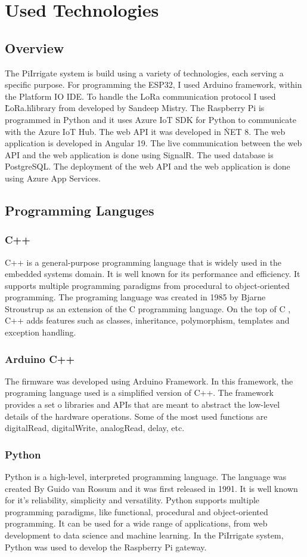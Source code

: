 \section{Used Technologies}
\subsection{Overview}
The PiIrrigate system is build using a variety of technologies, each serving a specific purpose. For programming
the ESP32, I used Arduino framework, within the Platform IO IDE. To handle the LoRa communication protocol I used \"LoRa.h\" library from developed by
Sandeep Mistry. The Raspberry Pi is programmed in Python
and it uses Azure IoT SDK for Python to communicate with the Azure IoT Hub. 
The web API it was developed in \.NET 8. The web application is developed in Angular 19. The live communication between 
the web API and the web application is done using SignalR. The used database is PostgreSQL. The deployment of the web API and the web application
is done using Azure App Services.

\subsection{Programming Languges}
\subsubsection{C++}
C++ is a general-purpose programming language that is widely used in the embedded systems domain. It is well known
for its performance and efficiency. It supports multiple programming paradigms from procedural to object-oriented programming. 
The programing language was created in 1985 by Bjarne Stroustrup as an extension of the C programming language. On the top of C
, C++ adds features such as classes, inheritance, polymorphism, templates and exception handling.

\subsubsection {Arduino C++}
The firmware was developed using Arduino Framework. In this framework, the programing language used is a simplified version of C++.
The framework provides a set o libraries and APIs that are meant to abstract the low-level details of the hardware operations. Some of the
most used functions are digitalRead, digitalWrite, analogRead, delay, etc.

\subsubsection{Python}
Python is a high-level, interpreted programming language. The language was created By Guido van Rossum and it was first released in 1991.
It is well known for it's reliability, simplicity and versatility. Python supports multiple programming paradigms, like functional, procedural and
object-oriented programming. It can be used for a wide range of applications, from web development to data science and machine learning.
In the PiIrrigate system, Python was used to develop the Raspberry Pi gateway. 

